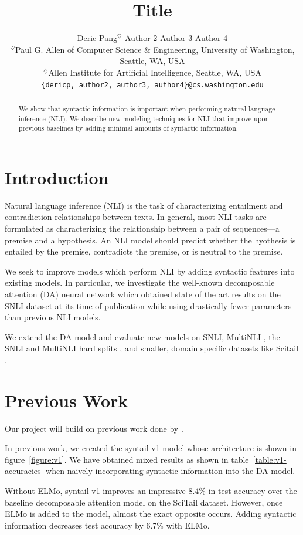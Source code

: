 \documentclass[11pt,a4paper]{article}
\title{Title}
\author{
  Deric Pang$^\heartsuit$ \quad
  Author 2 \quad
  Author 3 \quad
  Author 4 \\
  $^\heartsuit$Paul G. Allen of Computer Science \& Engineering,
    University of Washington,
    Seattle, WA, USA \\
  $^\diamondsuit$Allen Institute for Artificial Intelligence, Seattle, WA,
    USA \\
  {\tt \{dericp, author2, author3, author4\}@cs.washington.edu} \\
}
\date{}
\begin{document}
\maketitle
\begin{abstract}
  We show that syntactic information is important when performing natural
  language inference (NLI). We describe new modeling techniques for NLI that
  improve upon previous baselines by adding minimal amounts of syntactic
  information.
\end{abstract}

\section{Introduction}

Natural language inference (NLI) is the task of characterizing entailment and
contradiction relationships between texts.
In general, most NLI tasks are formulated as characterizing the relationship
between a pair of sequences---a premise and a hypothesis. An NLI model should
predict whether the hyothesis is entailed by the premise, contradicts the
premise, or is neutral to the premise.

We seek to improve models which
perform NLI by adding syntactic features into existing models. In particular,
we investigate the well-known decomposable attention (DA) neural network
\citep{Parikh2016-em} which obtained state of the art results on the
SNLI \citep{Bowman2015-is} dataset at its time of publication while using
drastically fewer parameters than previous NLI models.

We extend the DA model and evaluate new models on SNLI, MultiNLI
\citep{Williams2017-uh}, the SNLI and MultiNLI hard splits
\citep{Gururangan2018-lj}, and smaller, domain specific datasets like Scitail
\citep{Khot2018-th}.


\section{Previous Work}

Our project will build on previous work done by \citet{Pang2018-syntail}.

In previous work, we created the syntail-v1 model whose architecture is shown
in figure~\ref{figure:v1}.  We have obtained mixed results as shown in
table~\ref{table:v1-accuracies} when naively incorporating syntactic
information into the DA model.

Without ELMo, syntail-v1 improves an impressive 8.4\% in test accuracy over the
baseline decomposable attention model on the SciTail dataset. However, once
ELMo is added to the model, almost the exact opposite occurs. Adding syntactic
information decreases test accuracy by 6.7\% with ELMo.
\end{document}

